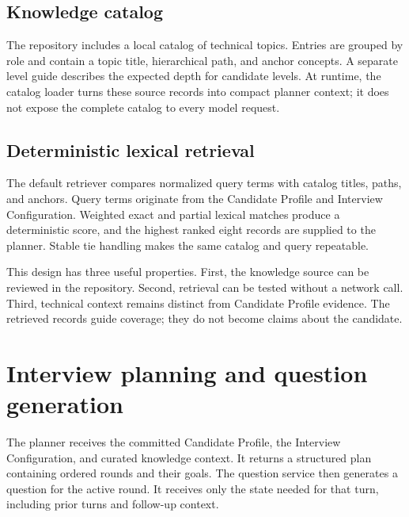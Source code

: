 \subsection{Knowledge catalog}

The repository includes a local catalog of technical topics. Entries are grouped by role and contain a topic title, hierarchical path, and anchor concepts. A separate level guide describes the expected depth for candidate levels. At runtime, the catalog loader turns these source records into compact planner context; it does not expose the complete catalog to every model request.

\subsection{Deterministic lexical retrieval}

The default retriever compares normalized query terms with catalog titles, paths, and anchors. Query terms originate from the Candidate Profile and Interview Configuration. Weighted exact and partial lexical matches produce a deterministic score, and the highest ranked eight records are supplied to the planner. Stable tie handling makes the same catalog and query repeatable.


This design has three useful properties. First, the knowledge source can be reviewed in the repository. Second, retrieval can be tested without a network call. Third, technical context remains distinct from Candidate Profile evidence. The retrieved records guide coverage; they do not become claims about the candidate.

\section{Interview planning and question generation}

The planner receives the committed Candidate Profile, the Interview Configuration, and curated knowledge context. It returns a structured plan containing ordered rounds and their goals. The question service then generates a question for the active round. It receives only the state needed for that turn, including prior turns and follow-up context.


